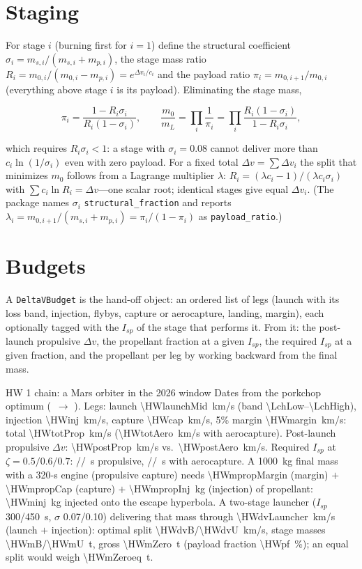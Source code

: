 \documentclass[11pt,letterpaper,oneside]{report}
\newcommand{\dv}{\Delta v}
\newcommand{\Isp}{{I_{sp}}}
\newcommand{\code}[1]{\texttt{#1}}
\begin{document}
\section{Staging}
For stage $i$ (burning first for $i=1$) define the structural coefficient
$\sigma_i=m_{s,i}/(m_{s,i}+m_{p,i})$, the stage mass ratio $R_i=m_{0,i}/(m_{0,i}-m_{p,i})=e^{\dv_i/c_i}$
and the payload ratio $\pi_i=m_{0,i+1}/m_{0,i}$ (everything above stage $i$ is its payload).
Eliminating the stage mass,
\begin{keyresult}
\begin{equation}
  \pi_i=\frac{1-R_i\sigma_i}{R_i(1-\sigma_i)},\qquad
  \frac{m_0}{m_L}=\prod_i\frac{1}{\pi_i}=\prod_i\frac{R_i(1-\sigma_i)}{1-R_i\sigma_i},
\end{equation}
\end{keyresult}
which requires $R_i\sigma_i<1$: a stage with $\sigma_i=0.08$ cannot deliver more than
$c_i\ln(1/\sigma_i)$ even with zero payload. For a fixed total $\dv=\sum\dv_i$ the split that
minimizes $m_0$ follows from a Lagrange multiplier $\lambda$:
$R_i=(\lambda c_i-1)/(\lambda c_i\sigma_i)$ with $\sum c_i\ln R_i=\dv$---one scalar root; identical
stages give equal $\dv_i$. (The package names $\sigma_i$ \code{structural\_fraction} and reports
$\lambda_i=m_{0,i+1}/(m_{s,i}+m_{p,i})=\pi_i/(1-\pi_i)$ as \code{payload\_ratio}.)

\section{Budgets}
A \code{DeltaVBudget} is the hand-off object: an ordered list of legs (launch with its loss band,
injection, flybys, capture or aerocapture, landing, margin), each optionally tagged with the $\Isp$
of the stage that performs it. From it: the post-launch propulsive $\dv$, the propellant fraction at
a given $\Isp$, the required $\Isp$ at a given fraction, and the propellant per leg by working
backward from the final mass.

\begin{worked}{HW 1 chain: a Mars orbiter in the 2026 window}
Dates from the porkchop optimum (\HWdepart\ $\to$ \HWarrive). Legs: launch
\SI{\HWlaunchMid}{km/s} (band \SIrange{\LchLow}{\LchHigh}{}), injection \SI{\HWinj}{km/s},
capture \SI{\HWcap}{km/s}, 5\% margin \SI{\HWmargin}{km/s}: total \SI{\HWtotProp}{km/s}
(\SI{\HWtotAero}{km/s} with aerocapture). Post-launch propulsive $\dv$: \SI{\HWpostProp}{km/s}
vs.\ \SI{\HWpostAero}{km/s}. Required $\Isp$ at $\zeta=0.5/0.6/0.7$: \HWIspPropFive/\HWIspPropSix/\HWIspPropSeven~s
propulsive, \HWIspAeroFive/\HWIspAeroSix/\HWIspAeroSeven~s with aerocapture. A \SI{1000}{kg} final mass
with a 320-s engine (propulsive capture) needs \SI{\HWmpropMargin}{} (margin) $+$ \SI{\HWmpropCap}{}
(capture) $+$ \SI{\HWmpropInj}{kg} (injection) of propellant: \SI{\HWminj}{kg} injected onto
the escape hyperbola. A two-stage launcher ($\Isp$ 300/450~s, $\sigma$ 0.07/0.10) delivering that
mass through \SI{\HWdvLauncher}{km/s} (launch $+$ injection): optimal split \SI{\HWdvB}{}/\SI{\HWdvU}{km/s},
stage masses \SI{\HWmB}{}/\SI{\HWmU}{t}, gross \SI{\HWmZero}{t} (payload fraction \SI{\HWpf}{\percent});
an equal split would weigh \SI{\HWmZeroeq}{t}.
\end{worked}
\end{document}
